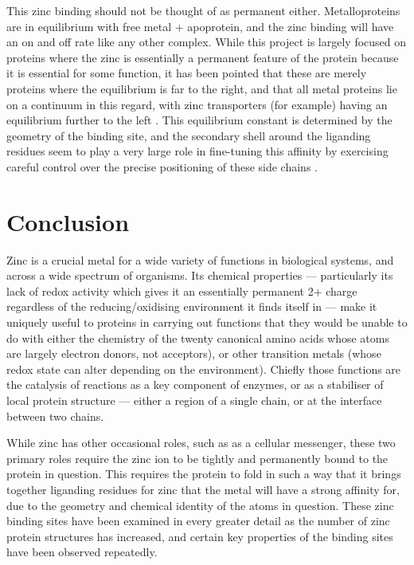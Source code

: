 This zinc binding should not be thought of as permanent either. Metalloproteins are in equilibrium with free metal + apoprotein, and the zinc binding will have an on and off rate like any other complex. While this project is largely focused on proteins where the zinc is essentially a permanent feature of the protein because it is essential for some function, it has been pointed that these are merely proteins where the equilibrium is far to the right, and that all metal proteins lie on a continuum in this regard, with zinc transporters (for example) having an equilibrium further to the left \cite{maret2010metalloproteomics}. This equilibrium constant is determined by the geometry of the binding site, and the secondary shell around the liganding residues seem to play a very large role in fine-tuning this affinity by exercising careful control over the precise positioning of these side chains \cite{kochanczyk2015relationship}.

\section{Conclusion}

Zinc is a crucial metal for a wide variety of functions in biological systems, and across a wide spectrum of organisms. Its chemical properties --- particularly its lack of redox activity which gives it an essentially permanent 2+ charge regardless of the reducing/oxidising environment it finds itself in --- make it uniquely useful to proteins in carrying out functions that they would be unable to do with either the chemistry of the twenty canonical amino acids whose atoms are largely electron donors, not acceptors), or other transition metals (whose redox state can alter depending on the environment). Chiefly those functions are the catalysis of reactions as a key component of enzymes, or as a stabiliser of local protein structure --- either a region of a single chain, or at the interface between two chains.

While zinc has other occasional roles, such as as a cellular messenger, these two primary roles require the zinc ion to be tightly and permanently bound to the protein in question. This requires the protein to fold in such a way that it brings together liganding residues for zinc that the metal will have a strong affinity for, due to the geometry and chemical identity of the atoms in question. These zinc binding sites have been examined in every greater detail as the number of zinc protein structures has increased, and certain key properties of the binding sites have been observed repeatedly.

